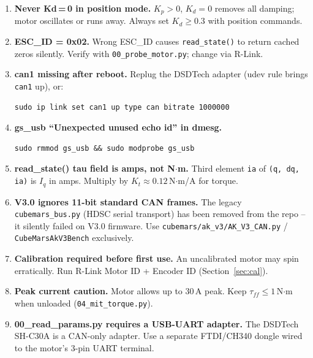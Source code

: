 \documentclass[11pt,a4paper]{article}
\begin{document}
\begin{enumerate}

\item \textbf{Never Kd\,=\,0 in position mode.}
  $K_p > 0$, $K_d = 0$ removes all damping; motor oscillates or runs away.
  Always set $K_d \ge 0.3$ with position commands.

\item \textbf{ESC\_ID = 0x02.}
  Wrong ESC\_ID causes \texttt{read\_state()} to return cached zeros
  silently.  Verify with \texttt{00\_probe\_motor.py}; change via R-Link.

\item \textbf{can1 missing after reboot.}
  Replug the DSDTech adapter (udev rule brings \texttt{can1} up), or:
\begin{lstlisting}[numbers=none]
sudo ip link set can1 up type can bitrate 1000000
\end{lstlisting}

\item \textbf{gs\_usb ``Unexpected unused echo id'' in dmesg.}
\begin{lstlisting}[numbers=none]
sudo rmmod gs_usb && sudo modprobe gs_usb
\end{lstlisting}

\item \textbf{read\_state() tau field is amps, not N$\cdot$m.}
  Third element \texttt{ia} of \texttt{(q, dq, ia)} is $I_q$ in amps.
  Multiply by $K_t \approx 0.12$\,N$\cdot$m/A for torque.

\item \textbf{V3.0 ignores 11-bit standard CAN frames.}
  The legacy \texttt{cubemars\_bus.py} (HDSC serial transport) has been
  removed from the repo -- it silently failed on V3.0 firmware.
  Use \texttt{cubemars/ak\_v3/AK\_V3\_CAN.py} / \texttt{CubeMarsAkV3Bench} exclusively.

\item \textbf{Calibration required before first use.}
  An uncalibrated motor may spin erratically.  Run R-Link Motor ID +
  Encoder ID (Section~\ref{sec:cal}).

\item \textbf{Peak current caution.}
  Motor allows up to 30\,A peak.  Keep $\tau_{ff} \le 1$\,N$\cdot$m when
  unloaded (\texttt{04\_mit\_torque.py}).

\item \textbf{00\_read\_params.py requires a USB-UART adapter.}
  The DSDTech SH-C30A is a CAN-only adapter.  Use a separate FTDI/CH340
  dongle wired to the motor's 3-pin UART terminal.

\end{enumerate}
\end{document}

